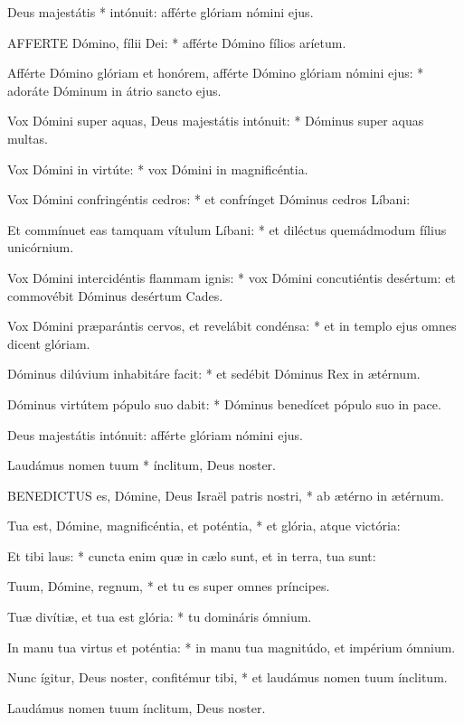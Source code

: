  Deus majestátis * intónuit: afférte glóriam nómini ejus.


\lettrine[lines=2]{A}{FFERTE} Dómino, fílii Dei: * afférte Dómino fílios aríetum.

Afférte Dómino glóriam et honórem, afférte Dómino glóriam nómini ejus: * adoráte Dóminum in átrio sancto ejus.

Vox Dómini super aquas, Deus majestátis intónuit: * Dóminus super aquas multas.

Vox Dómini in virtúte: * vox Dómini in magnificéntia.

Vox Dómini confringéntis cedros: * et confrínget Dóminus cedros Líbani:

Et commínuet eas tamquam vítulum Líbani: * et diléctus quemádmodum fílius unicórnium.

Vox Dómini intercidéntis flammam ignis: * vox Dómini concutiéntis desértum: et commovébit Dóminus desértum Cades.

Vox Dómini præparántis cervos, et revelábit condénsa: * et in templo ejus omnes dicent glóriam.

Dóminus dilúvium inhabitáre facit: * et sedébit Dóminus Rex in ætérnum.

Dóminus virtútem pópulo suo dabit: * Dóminus benedícet pópulo suo in pace.

 Deus majestátis intónuit: afférte glóriam nómini ejus.

 Laudámus nomen tuum * ínclitum, Deus noster.


\lettrine[lines=2]{B}{ENEDICTUS} es, Dómine, Deus Israël patris nostri, * ab ætérno in ætérnum.

Tua est, Dómine, magnificéntia, et poténtia, * et glória, atque victória:

Et tibi laus: * cuncta enim quæ in cælo sunt, et in terra, tua sunt:

Tuum, Dómine, regnum, * et tu es super omnes príncipes.

Tuæ divítiæ, et tua est glória: * tu domináris ómnium.

In manu tua virtus et poténtia: * in manu tua magnitúdo, et impérium ómnium.

Nunc ígitur, Deus noster, confitémur tibi, * et laudámus nomen tuum ínclitum.

 Laudámus nomen tuum ínclitum, Deus noster.

